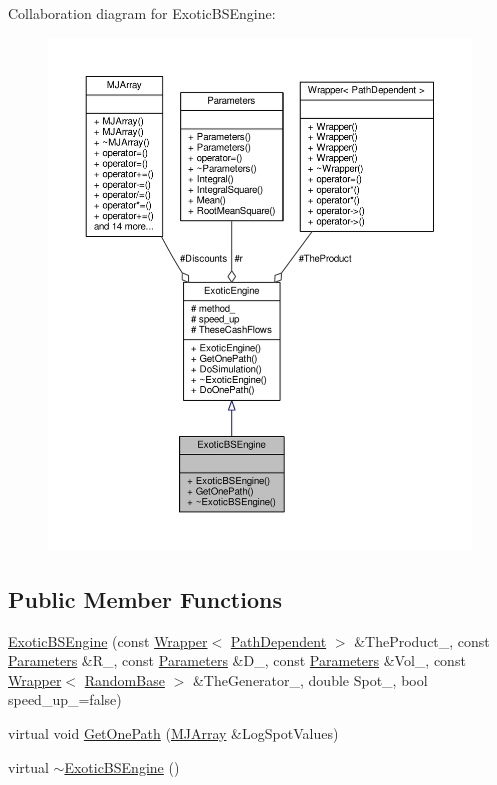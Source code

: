 Collaboration diagram for Exotic\+B\+S\+Engine\+:
\nopagebreak
\begin{figure}[H]
\begin{center}
\leavevmode
\includegraphics[width=350pt]{classExoticBSEngine__coll__graph}
\end{center}
\end{figure}
\subsection*{Public Member Functions}
\begin{DoxyCompactItemize}
\item 
\hyperlink{classExoticBSEngine_a8a54a128a72a82acfa40e6f144775350}{Exotic\+B\+S\+Engine} (const \hyperlink{classWrapper}{Wrapper}$<$ \hyperlink{classPathDependent}{Path\+Dependent} $>$ \&The\+Product\+\_\+, const \hyperlink{classParameters}{Parameters} \&R\+\_\+, const \hyperlink{classParameters}{Parameters} \&D\+\_\+, const \hyperlink{classParameters}{Parameters} \&Vol\+\_\+, const \hyperlink{classWrapper}{Wrapper}$<$ \hyperlink{classRandomBase}{Random\+Base} $>$ \&The\+Generator\+\_\+, double Spot\+\_\+, bool speed\+\_\+up\+\_\+=false)
\item 
virtual void \hyperlink{classExoticBSEngine_a4f621796857e8cf1b867d66daea2d690}{Get\+One\+Path} (\hyperlink{classMJArray}{M\+J\+Array} \&Log\+Spot\+Values)
\item 
virtual \hyperlink{classExoticBSEngine_a7c957a183892ed4cb5cf5f8969070921}{$\sim$\+Exotic\+B\+S\+Engine} ()
\end{DoxyCompactItemize}
